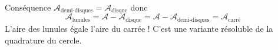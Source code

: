 \documentclass[11pt,a4paper]{article}
\theoremstyle{definition}
\begin{document}
Conséquence $\mathcal{A}_\text{demi-disques} = \mathcal{A}_\text{disque}$
donc
$$\mathcal{A}_\text{lunules} 
= \mathcal{A} - \mathcal{A}_\text{disque}
= \mathcal{A} - \mathcal{A}_\text{demi-disques}
= \mathcal{A}_\text{carré}$$
L'aire des lunules égale l'aire du carrée ! C'est une variante résoluble de la quadrature du cercle.

\fincorrection

\finexercice
\end{document}
